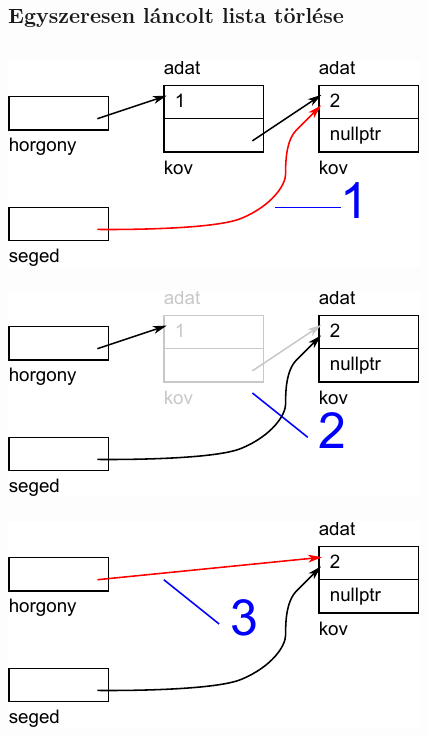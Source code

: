 \documentclass[usenames,dvipsnames,aspectratio=169]{beamer}
\begin{document}
\subsection{Egyszeresen láncolt lista törlése}
\begin{frame}[fragile]
  \scriptsize
  \begin{columns}[T]
      \includegraphics[scale=.6]{lista1/list1-20.pdf} \\
      \hrulefill \\
      \includegraphics[scale=.6]{lista1/list1-21.pdf} \\
      \hrulefill \\
      \includegraphics[scale=.6]{lista1/list1-22.pdf}
      \begin{exampleblock}{}
        \small
        
      \end{exampleblock}
  \end{columns}
\end{frame}
\end{document}
